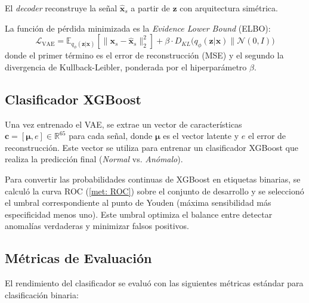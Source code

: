 \documentclass[11pt]{article}
\begin{document}
\noindent El \textit{decoder} reconstruye la señal $\hat{\mathbf{x}}_s$ a partir de $\mathbf{z}$ con arquitectura simétrica.%


La función de pérdida minimizada es la \textit{Evidence Lower Bound} (ELBO):
\vspace{-0.4em}
\begin{equation}
\mathcal{L}_{\mathrm{VAE}} = \mathbb{E}_{q_\phi(\mathbf{z}|\mathbf{x})}[\|\mathbf{x}_s - \hat{\mathbf{x}}_s\|_2^2] + \beta \cdot D_{KL}\bigl(q_\phi(\mathbf{z}|\mathbf{x}) \parallel \mathcal{N}(0,I)\bigr)
\end{equation}
\vspace{-0.2em}
donde el primer término es el error de reconstrucción (MSE) y el segundo la divergencia de Kullback-Leibler, ponderada por el hiperparámetro $\beta$.

\vspace{-0.1em}

\subsection{Clasificador XGBoost}
Una vez entrenado el VAE, se extrae un vector de características $\mathbf{c} = [\boldsymbol{\mu}, e] \in \mathbb{R}^{65}$ para cada señal, donde $\boldsymbol{\mu}$ es el vector latente y $e$ el error de reconstrucción. Este vector se utiliza para entrenar un clasificador XGBoost que realiza la predicción final (\textit{Normal} vs. \textit{Anómalo}).

Para convertir las probabilidades continuas de XGBoost en etiquetas binarias, se calculó la curva ROC (\ref{met: ROC}) sobre el conjunto de desarrollo y se seleccionó el umbral correspondiente al punto de Youden (máxima sensibilidad más especificidad menos uno). Este umbral optimiza el balance entre detectar anomalías verdaderas y minimizar falsos positivos. 

\subsection{Métricas de Evaluación}
El rendimiento del clasificador se evaluó con las siguientes métricas estándar para clasificación binaria:
\end{document}
